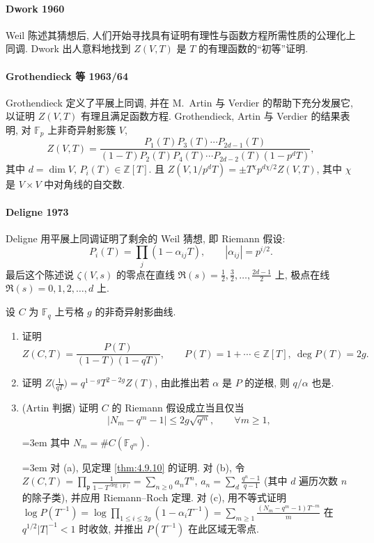 \paragraph{Dwork 1960}
Weil 陈述其猜想后, 人们开始寻找具有证明有理性与函数方程所需性质的公理化上同调. Dwork 出人意料地找到 $Z(V, T)$ 是 $T$ 的有理函数的``初等''证明.

\paragraph{Grothendieck 等 1963/64}
Grothendieck 定义了平展上同调, 并在 M.~Artin 与 Verdier 的帮助下充分发展它, 以证明 $Z(V, T)$ 有理且满足函数方程. Grothendieck, Artin 与 Verdier 的结果表明, 对 $\mathbb{F}_p$ 上非奇异射影簇 $V$,
\[
Z(V, T) = \frac{P_1(T)P_3(T)\cdots P_{2d-1}(T)}{(1-T)P_2(T)P_4(T)\cdots P_{2d-2}(T)(1-p^dT)},
\]
其中 $d = \dim V$, $P_i(T)\in\mathbb{Z}[T]$. 且 $Z(V, 1/p^dT) = \pm T^\chi p^{d\chi/2}Z(V, T)$, 其中 $\chi$ 是 $V\times V$ 中对角线的自交数.

\paragraph{Deligne 1973}
Deligne 用平展上同调证明了剩余的 Weil 猜想, 即 Riemann 假设:
\[
P_i(T) = \prod_j(1-\alpha_{ij}T), \qquad |\alpha_{ij}| = p^{i/2}.
\]
最后这个陈述说 $\zeta(V, s)$ 的零点在直线 $\Re(s) = \frac{1}{2}, \frac{3}{2}, \dots, \frac{2d-1}{2}$ 上, 极点在线 $\Re(s) = 0, 1, 2, \dots, d$ 上.

\begin{exercise} \label{thm:4.9.15} 
设 $C$ 为 $\mathbb{F}_q$ 上亏格 $g$ 的非奇异射影曲线.
\begin{enumerate}[label=\textup{(\alph*)}]
	\item 证明
	\[
	Z(C, T) = \frac{P(T)}{(1-T)(1-qT)}, \qquad P(T) = 1 + \cdots\in\mathbb{Z}[T], \ \deg P(T) = 2g.
	\]
	\item 证明 $Z\bigl(\frac{1}{qT}\bigr) = q^{1-g}T^{2-2g}Z(T)$, 由此推出若 $\alpha$ 是 $P$ 的逆根, 则 $q/\alpha$ 也是.
	\item (Artin 判据) 证明 $C$ 的 Riemann 假设成立当且仅当
	\[
	|N_m - q^m - 1|\le 2g\sqrt{q^m}, \qquad \forall m\ge 1,
	\]
{\emergencystretch=3em 	其中 $N_m = \#C(\mathbb{F}_{q^m})$.\par}
	\begin{hint}
{\emergencystretch=3em 		对 (a), 见定理 \ref{thm:4.9.10} 的证明. 对 (b), 令 $Z(C, T) = \prod_{\mathfrak{p}}\frac{1}{1-T^{\deg(\mathfrak{p})}} = \sum_{n\ge 0}a_nT^n$, $a_n = \sum_d\frac{q^n-1}{q-1}$ (其中 $d$ 遍历次数 $n$ 的除子类), 并应用 Riemann--Roch 定理. 对 (c), 用不等式证明 $\log P(T^{-1}) = \log\prod_{1\le i\le 2g}(1-\alpha_iT^{-1}) = \sum_{m\ge 1}\frac{(N_m - q^m - 1)T^{-m}}{m}$ 在 $q^{1/2}|T|^{-1} < 1$ 时收敛, 并推出 $P(T^{-1})$ 在此区域无零点.\par}
	\end{hint}
\end{enumerate}
\end{exercise}

